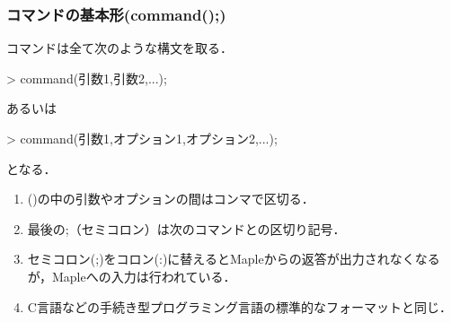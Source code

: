 \subsubsection{コマンドの基本形(command();)}
コマンドは全て次のような構文を取る．
\begin{MapleInput}
> command(引数1,引数2,...);
\end{MapleInput}
あるいは
\begin{MapleInput}
> command(引数1,オプション1,オプション2,...);
\end{MapleInput}
となる．

\begin{enumerate}
\item ()の中の引数やオプションの間はコンマで区切る．
\item 最後の;（セミコロン）は次のコマンドとの区切り記号．
\item セミコロン(;)をコロン(:)に替えるとMapleからの返答が出力されなくなるが，Mapleへの入力は行われている．
\item C言語などの手続き型プログラミング言語の標準的なフォーマットと同じ．
\end{enumerate}

